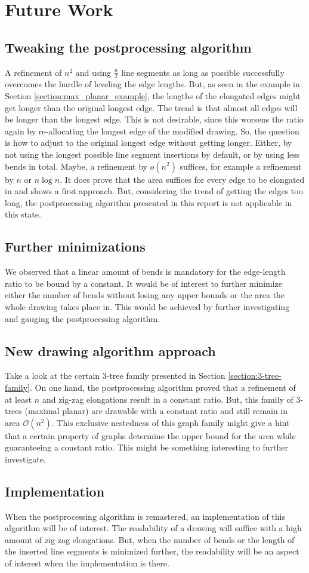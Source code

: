 \section{Future Work}
\subsection{Tweaking the postprocessing algorithm}
A refinement of $n^2$ and using $\frac{n}{2}$ line segments as long as possible successfully overcomes the hurdle of leveling the edge lengths. But, as seen in the example in Section \ref{section:max_planar_example}, the lengths of the elongated edges might get longer than the original longest edge. The trend is that almost all edges will be longer than the longest edge. This is not desirable, since this worsens the ratio again by re-allocating the longest edge of the modified drawing. So, the question is how to adjust to the original longest edge without getting longer. Either, by not using the longest possible line segment insertions by default, or by using less bends in total. Maybe, a refinement by $o(n^2)$ suffices, for example a refinement by $n$ or $n\log n$. It does prove that the area suffices for every edge to be elongated in and shows a first approach. But, considering the trend of getting the edges too long, the postprocessing algorithm presented in this report is not applicable in this state.
\subsection{Further minimizations}
We observed that a linear amount of bends is mandatory for the edge-length ratio to be bound by a constant. It would be of interest to further minimize either the number of bends without losing any upper bounds or the area the whole drawing takes place in. This would be achieved by further investigating and gauging the postprocessing algorithm. 
\subsection{New drawing algorithm approach} 
Take a look at the certain 3-tree family presented in Section \ref{section:3-tree-family}. On one hand, the postprocessing algorithm proved that a refinement of at least $n$ and zig-zag elongations result in a constant ratio. But, this family of 3-trees (maximal planar) are drawable with a constant ratio and still remain in area $\mathcal{O}(n^2)$. This exclusive nestedness of this graph family might give a hint that a certain property of graphs determine the upper bound for the area while guaranteeing a constant ratio. This might be something interesting to further investigate.
\subsection{Implementation}
When the postprocessing algorithm is remastered, an implementation of this algorithm will be of interest. The readability of a drawing will suffice with a high amount of zig-zag elongations. But, when the number of bends or the length of the inserted line segments is minimized further, the readability will be an aspect of interest when the implementation is there.